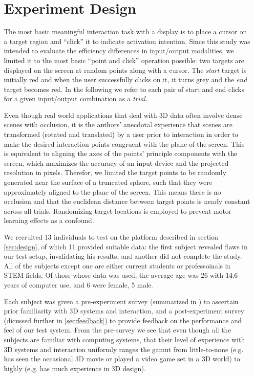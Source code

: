\section{Experiment Design}\label{sec:experiment}

The most basic meaningful interaction task with a display is to place a cursor
on a target region and ``click'' it to indicate activation intention.  Since
this study was intended to evaluate the efficiency differences in input/output
modalities, we limited it to the most basic ``point and click'' operation
possible: two targets are displayed on the screen at random points along with
a cursor.  The \emph{start} target is initially red and when the user
successfully clicks on it, it turns grey and the \emph{end} target becomes
red.  In the following we refer to each pair of start and end clicks for a
given input/output combination as a \emph{trial}.

Even though real world applications that deal with 3D data often involve dense
scenes with occlusion, it is the authors' anecdotal experience that scenes are
transformed (rotated and translated) by a user prior to interaction in order
to make the desired interaction points congruent with the plane of the screen.
This is equivalent to aligning the axes of the points' principle components
with the screen, which maximizes the accuracy of an input device and the
projected resolution in pixels.  Therefor, we limited the target points to be
randomly generated near the surface of a truncated sphere, such that they were
approximately aligned to the plane of the screen.  This means there is no
occlusion and that the euclidean distance between target points is nearly
constant across all trials.  Randomizing target locations is employed to
prevent motor learning effects as a confound.

We recruited 13 individuals to test on the platform described in section
\ref{sec:design}, of which 11 provided suitable data: the first subject
revealed flaws in our test setup, invalidating his results, and another did
not complete the study.  All of the subjects except one are either current
students or professoinals in STEM fields.  Of those whose data was used, the
average age was 26 with 14.6 years of computer use, and 6 were female, 5 male.

Each subject was given a pre-experiment survey (summarized in
) to ascertain prior familiarity with 3D systems and
interaction, and a post-experiment survey (dicussed further in
\ref{sec:feedback}) to provide feedback on the performance and feel of our
test system.  From the pre-survey we see that even though all the subjects are
familiar with computing systems, that their level of experience with 3D
systems and interaction uniformly ranges the gamut from little-to-none
(e.g. has seen the occasional 3D movie or played a video game set in a 3D
world) to highly (e.g. has much experience in 3D design).

